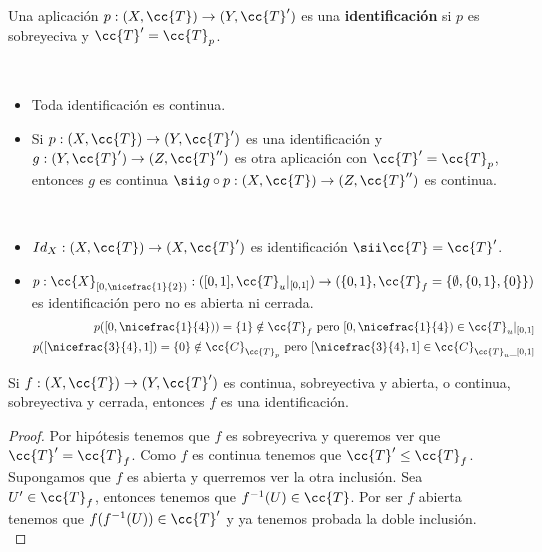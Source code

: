 \begin{definicion}
    Una aplicación $p:(X, \cc{T})\to (Y, \cc{T}')$ es una \textbf{identificación} si $p$ es sobreyeciva y $\cc{T}'=\cc{T}_p$.
    \endsquare
\end{definicion}

\begin{observacion}\
    \begin{itemize}
        \item Toda identificación es continua.
        \item Si $p:(X, \cc{T})\to (Y, \cc{T}')$ es una identificación y $g:(Y, \cc{T}')\to(Z, \cc{T}'')$ es otra aplicación con $\cc{T}'=\cc{T}_p$, entonces $g$ es continua $\sii g\circ p: (X, \cc{T})\to (Z, \cc{T}'')$ es continua.
    \end{itemize}
\end{observacion}

\begin{ejemplo}\
    \begin{itemize}
        \item $Id_X:(X, \cc{T})\to (X, \cc{T}')$ es identificación $\sii \cc{T}=\cc{T}'$.
        \item $p: \cc{X}_{[0,\nicefrac{1}{2})}:([0,1], \cc{T}_u|_{[0,1]})\to (\{0,1\}, \cc{T}_f=\{\emptyset, \{0,1\}, \{0\}\})$ es identificación pero no es abierta ni cerrada.
        \begin{align*}
            p([0,\nicefrac{1}{4})) = \{1\}\notin \cc{T}_f \text{ pero } [0,\nicefrac{1}{4})\in \cc{T}_u|_{[0,1]}\\
            p([\nicefrac{3}{4}, 1])=\{0\}\notin \cc{C}_{\cc{T}_p} \text{ pero } [\nicefrac{3}{4}, 1] \in \cc{C}_{\cc{T}_u\_{[0,1]}}
        \end{align*}
    \end{itemize}
    \endsquare
\end{ejemplo}

\begin{prop}
    Si $f:(X, \cc{T})\to (Y, \cc{T}')$ es continua, sobreyectiva y abierta, o continua, sobreyectiva y cerrada, entonces $f$ es una identificación.
    \begin{proof}
        Por hipótesis tenemos que $f$ es sobreyecriva y queremos ver que $\cc{T}'=\cc{T}_f$. Como $f$ es continua tenemos que $\cc{T}'\leq \cc{T}_f$. Supongamos que $f$ es abierta y querremos ver la otra inclusión. Sea $U'\in \cc{T}_f$, entonces tenemos que $f^{-1}(U)\in \cc{T}$. Por ser $f$ abierta tenemos que $f(f^{-1}(U))\in \cc{T}'$ y ya tenemos probada la doble inclusión.\\

    \end{proof}
\end{prop}

